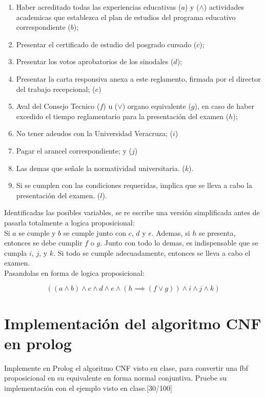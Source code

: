 \documentclass[11pt, letterpaper]{article}
\begin{document}
	\begin{enumerate}[I]
	\item Haber acreditado todas las experiencias educativas ($a$) y ($\wedge$) actividades academicas que establezca el plan de estudios del programa educativo correspondiente ($b$);
	
	\item Presentar el certificado de estudio del posgrado cursado ($c$);
	\item Presentar los votos aprobatorios de los sinodales ($d$);
	\item Presentar la carta responsiva anexa a este reglamento, firmada por el director del trabajo recepcional; ($e$)
	\item Aval del Consejo Tecnico ($f$) u ($\vee$) organo equivalente ($g$), en caso de haber excedido el tiempo reglamentario para la presentación del examen ($h$);
	\item No tener adeudos con la Universidad Veracruza; ($i$)
	\item Pagar el arancel correspondiente; y ($j$)
	\item Las demas que señale la normatividad universitaria. ($k$).
	\item Si se cumplen con las condiciones requeridas, implica que se lleva a cabo la presentación del examen. ($l$).
	\end{enumerate}

	Identificadas las posibles variables, se re escribe una versión simplificada antes de pasarla totalmente a logica proposicional: \\
	
	Si $a$ se cumple y $b$ se cumple junto con $c$, $d$ y $e$. Ademas, si $h$ se presenta, entonces se debe cumplir $f$ o $g$. Junto con todo lo demas, es indispensable que se cumpla $i$, $j$, y $k$. Si todo se cumple adecuadamente, entonces se lleva a cabo el examen. \\
	
	Pasandolas en forma de logica proposicional:
	
	$$((a \wedge b) \wedge c \wedge d \wedge e \wedge (h \implies (f \vee g)) \wedge i \wedge j \wedge k)$$
	
	
	\newpage
	
	\section{Implementación del algoritmo CNF en prolog}
	
	Implemente en Prolog el algoritmo CNF visto en clase, para convertir una
	fbf proposicional en su equivalente en forma normal conjuntiva. Pruebe su
	implementación con el ejemplo visto en clase.[30/100]
	
\end{document}
